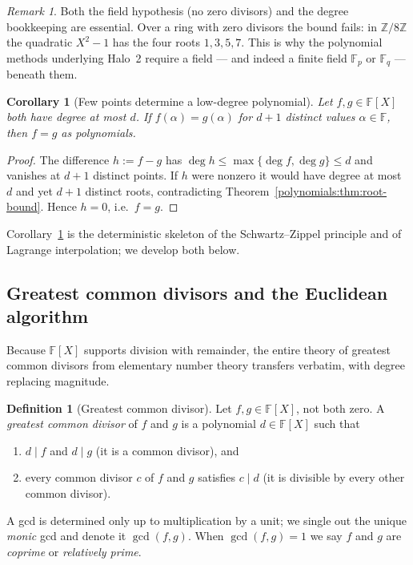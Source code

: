 \documentclass[11pt,a4paper]{article}
\newtheorem{corollary}[theorem]{Corollary}
\theoremstyle{definition}
\newtheorem{definition}[theorem]{Definition}
\theoremstyle{remark}
\newtheorem{remark}[theorem]{Remark}
\newcommand{\Z}{\ensuremath{\mathbb{Z}}}
\newcommand{\F}{\ensuremath{\mathbb{F}}}
\newcommand{\Fp}{\ensuremath{\mathbb{F}_{p}}}
\newcommand{\Fq}{\ensuremath{\mathbb{F}_{q}}}
\begin{document}
\begin{remark}\label{polynomials:rem:field-needed}
Both the field hypothesis (no zero divisors) and the degree bookkeeping are
essential. Over a ring with zero divisors the bound fails: in
\(\Z/8\Z\) the quadratic \(X^2 - 1\) has the four roots \(1, 3, 5, 7\). This is
why the polynomial methods underlying Halo~2 require a field — and indeed
a finite field \(\Fp\) or \(\Fq\) — beneath them.
\end{remark}

\begin{corollary}[Few points determine a low-degree polynomial]
\label{polynomials:cor:agree-implies-equal}
Let \(f, g \in \F[X]\) both have degree at most \(d\). If \(f(\alpha) =
g(\alpha)\) for \(d + 1\) distinct values \(\alpha \in \F\), then \(f = g\) as
polynomials.
\end{corollary}

\begin{proof}
The difference \(h := f - g\) has \(\deg h \le \max\{\deg f, \deg g\} \le d\) and
vanishes at \(d + 1\) distinct points. If \(h\) were nonzero it would have degree
at most \(d\) and yet \(d + 1\) distinct roots, contradicting
Theorem~\ref{polynomials:thm:root-bound}. Hence \(h = 0\), i.e.\ \(f = g\).
\end{proof}

Corollary~\ref{polynomials:cor:agree-implies-equal} is the deterministic
skeleton of the Schwartz--Zippel principle and of Lagrange interpolation; we
develop both below.

\subsection{Greatest common divisors and the Euclidean algorithm}
\label{polynomials:subsec:gcd}

Because \(\F[X]\) supports division with remainder, the entire theory of greatest
common divisors from elementary number theory transfers verbatim, with degree
replacing magnitude.

\begin{definition}[Greatest common divisor]\label{polynomials:def:gcd}
Let \(f, g \in \F[X]\), not both zero. A \emph{greatest common divisor} of \(f\)
and \(g\) is a polynomial \(d \in \F[X]\) such that
\begin{enumerate}
  \item \(d \mid f\) and \(d \mid g\) (it is a common divisor), and
  \item every common divisor \(c\) of \(f\) and \(g\) satisfies \(c \mid d\)
        (it is divisible by every other common divisor).
\end{enumerate}
A gcd is determined only up to multiplication by a unit; we single out the unique
\emph{monic} gcd and denote it \(\gcd(f, g)\). When \(\gcd(f, g) = 1\) we say
\(f\) and \(g\) are \emph{coprime} or \emph{relatively prime}.
\end{definition}
\end{document}
